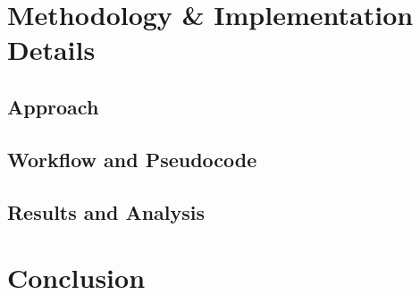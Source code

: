 \documentclass[a4paper]{acmsiggraph}
\begin{document}
\section{Methodology \& Implementation Details}
\subsection{Approach}
\lipsum[2]

\subsection{Workflow and Pseudocode}
\lipsum[3]

\subsection{Results and Analysis}
\lipsum[4]

\section{Conclusion}
\lipsum[1]



\end{document}
